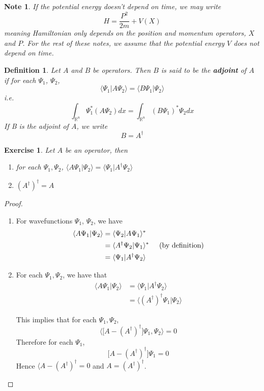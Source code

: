 \documentclass[12pt]{amsart}
\newtheorem{defn}[thm]{Definition}
\newtheorem{note}[thm]{Note}
\newtheorem{ex}[thm]{Exercise}
\renewcommand{\r}{\rangle}
\renewcommand{\l}{\langle}
\newcommand{\R}{\mathbb{R}}
\begin{document}
\begin{note}
If the potential energy doesn't depend on time, we may write $$H = \frac{P^2}{2m} + V(X)$$ meaning Hamiltonian only depends on the position and momentum operators, $X$ and $P$. For the rest of these notes, we assume that the potential energy $V$ does not depend on time.
\end{note}

\begin{defn}
Let $A$ and $B$ be operators. Then $B$ is said to be the \textbf{adjoint} of $A$ if for each $\Psi_1$, $\Psi_2$, $$\l \Psi_1 \vert A\Psi_2 \r = \l B \Psi_1 \vert \Psi_2 \r$$ i.e. $$\int_{\R^n}\Psi_1^* (A\Psi_2) dx = \int_{\R^n}(B\Psi_1)^* \Psi_2 dx$$ If B is the adjoint of $A$, we write $$B = A^{\dagger}$$
\end{defn}

\begin{ex}
Let $A$ be an operator, then \begin{enumerate}
\item for each $\Psi_1, \Psi_2$, $\l A\Psi_1 \vert \Psi_2 \r = \l   \Psi_1 \vert A^{\dagger} \Psi_2 \r$ 
\item $(A^{\dagger})^{\dagger} = A$
\end{enumerate}
\end{ex}

\begin{proof}
\begin{enumerate}
\item For wavefunctions $\Psi_1$, $\Psi_2$, we have
\begin{align*}
\l A \Psi_1 \vert \Psi_2 \r
&= \l \Psi_2 \vert A \Psi_1 \r^*\\
&= \l A^{\dagger}\Psi_2 \vert  \Psi_1 \r^* \hspace{.5cm} \text{(by definition)}\\
&= \l  \Psi_1 \vert A^{\dagger}\Psi_2 \r
\end{align*}
\item For each $\Psi_1, \Psi_2$, we have that
\begin{align*}
\l  A\Psi_1 \vert \Psi_2 \r
&= \l   \Psi_1 \vert A^{\dagger}\Psi_2 \r \\
&= \l  (A^{\dagger})^{\dagger} \Psi_1 \vert \Psi_2 \r
\end{align*}

This implies that for each $\Psi_1, \Psi_2$, $$\big \l \big[A-(A^{\dagger})^{\dagger} \big] \Psi_1, \Psi_2 \big \r = 0$$ Therefore for each $\Psi_1$, $$ \big[A-(A^{\dagger})^{\dagger} \big] \Psi_1 = 0$$ Hence $ \l A-(A^{\dagger})^{\dagger}  = 0$ and $A = (A^{\dagger})^{\dagger}$.
\end{enumerate}
\end{proof}
\end{document}
